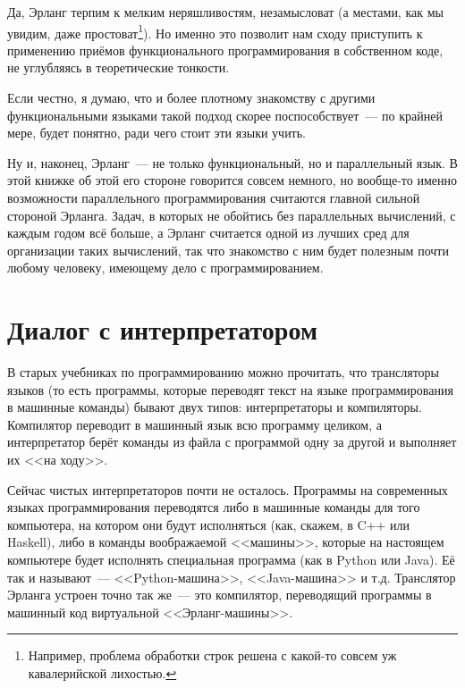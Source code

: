 \documentclass[
  paper=a4,
  fontsize=14pt,
  openany,
  appendixprefix=true
]{scrbook}
\begin{document}
Да, Эрланг терпим к мелким неряшливостям, незамысловат (а местами, как мы увидим, даже простоват\footnote{Например, проблема обработки строк решена с какой-то совсем уж кавалерийской лихостью.}). Но именно это позволит нам сходу приступить к применению приёмов функционального программирования в собственном коде, не углубляясь в теоретические тонкости.

Если честно, я думаю, что и более плотному знакомству с другими функциональными языками такой подход скорее поспособствует~--- по крайней мере, будет понятно, ради чего стоит эти языки учить.

Ну и, наконец, Эрланг~--- не только функциональный, но и параллельный язык. В этой книжке об этой его стороне говорится совсем немного, но вообще-то именно возможности параллельного программирования считаются главной сильной стороной Эрланга. Задач, в которых не обойтись без параллельных вычислений, с каждым годом всё больше, а Эрланг считается одной из лучших сред для организации таких вычислений, так что знакомство с ним будет полезным почти любому человеку, имеющему дело с программированием.

\section{Диалог с интерпретатором}

В старых учебниках по программированию можно прочитать, что трансляторы языков (то есть программы, которые переводят текст на языке программирования в машинные команды) бывают двух типов: интерпретаторы и компиляторы. Компилятор переводит в машинный язык всю программу целиком, а интерпретатор берёт команды из файла с программой одну за другой и выполняет их <<на ходу>>.

Сейчас чистых интерпретаторов почти не осталось. Программы на современных языках программирования переводятся либо в машинные команды для того компьютера, на котором они будут исполняться (как, скажем, в C++ или Haskell), либо в команды воображаемой <<машины>>, которые на настоящем компьютере будет исполнять специальная программа (как в Python или Java). Её так и называют~--- <<Python-машина>>, <<Java-машина>> и т.д. Транслятор Эрланга устроен точно так же~--- это компилятор, переводящий программы в машинный код виртуальной <<Эрланг-машины>>.

\end{document}
